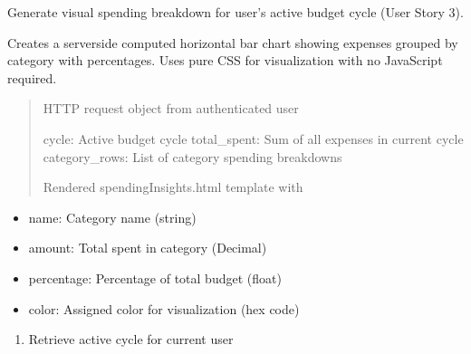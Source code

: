 \documentclass[letterpaper,10pt,english]{sphinxmanual}
\begin{document}

\begin{fulllineitems}
\label{\detokenize{expensesApp:expensesApp.views.spendingInsights}}
\pysigstartsignatures
\pysiglinewithargsret
{}
{}
{}
\pysigstopsignatures
\sphinxAtStartPar
Generate visual spending breakdown for user’s active budget cycle (User Story 3).

\sphinxAtStartPar
Creates a server\sphinxhyphen{}side computed horizontal bar chart showing expenses
grouped by category with percentages. Uses pure CSS for visualization
with no JavaScript required.
\begin{quote}\begin{description}
\sphinxAtStartPar
{} \textendash{} HTTP request object from authenticated user

\sphinxAtStartPar
cycle: Active budget cycle
total\_spent: Sum of all expenses in current cycle
category\_rows: List of category spending breakdowns

\sphinxAtStartPar
Rendered spendingInsights.html template with

\end{description}\end{quote}
\begin{description}
\begin{itemize}
\item {} 
\sphinxAtStartPar
name: Category name (string)

\item {} 
\sphinxAtStartPar
amount: Total spent in category (Decimal)

\item {} 
\sphinxAtStartPar
percentage: Percentage of total budget (float)

\item {} 
\sphinxAtStartPar
color: Assigned color for visualization (hex code)

\end{itemize}

\begin{enumerate}
%
\item {} 
\sphinxAtStartPar
Retrieve active cycle for current user


\end{enumerate}
\end{description}
\end{fulllineitems}
\end{document}
